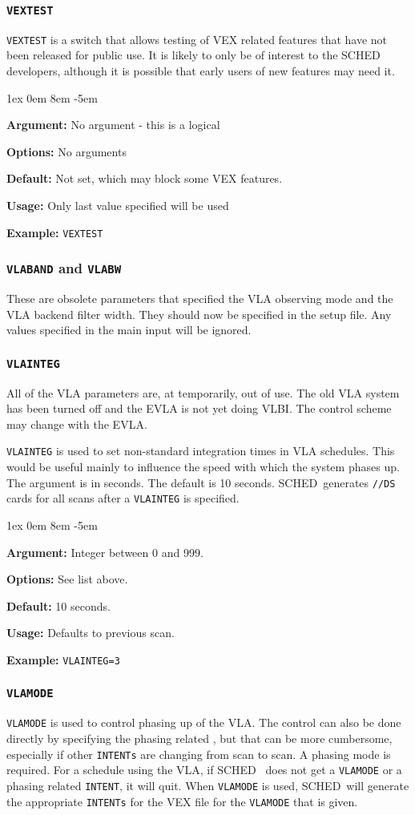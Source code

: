 \documentclass{report}
\newcommand{\schedb}{{\sc SCHED~}}
\newcommand{\rcwbox}[5]{
  \begin{list}{}{\parsep 1ex  \itemsep 0em
                 \leftmargin 8em  \itemindent -5em }
    \item {\bf Argument:} #1
    \item {\bf Options:}  #2
    \item {\bf Default:}  #3
    \item {\bf Usage:}    #4
    \item {\bf Example:}  #5
  \end{list}
}
\begin{document}
\subsubsection{\label{MP:VEXTEST}{\tt VEXTEST}}

{\tt VEXTEST} is a switch that allows testing of VEX related features
that have not been released for public use.  It is likely to only be
of interest to the SCHED developers, although it is possible that
early users of new features may need it.

\rcwbox
{No argument - this is a logical}
{No arguments}
{Not set, which may block some VEX features.}
{Only last value specified will be used}
{{\tt VEXTEST}}

\subsubsection{{\tt VLABAND} and {\tt VLABW}}

These are obsolete parameters that specified the VLA observing mode
and the VLA backend filter width.  They should now be specified in
the setup file.  Any values specified in the main input will be
ignored.


\subsubsection{\label{MP:VLAINTEG}{\tt VLAINTEG}}

All of the VLA parameters are, at temporarily, out of use.  The old
VLA system has been turned off and the EVLA is not yet doing VLBI.
The control scheme may change with the EVLA.

{\tt VLAINTEG} is used to set non-standard integration times in VLA
schedules.  This would be useful mainly to influence the speed with
which the system phases up.  The argument is in seconds.  The default
is 10 seconds.  \schedb generates {\tt //DS} cards for all scans
after a {\tt VLAINTEG} is specified.

\rcwbox
{Integer between 0 and 999.}
{See list above.}
{10 seconds.}
{Defaults to previous scan.}
{{\tt VLAINTEG=3}}


\subsubsection{\label{MP:VLAMODE}{\tt VLAMODE}}

{\tt VLAMODE} is used to control phasing up of the VLA.  The control
can also be done directly by specifying the phasing related
, but that can be more cumbersome,
especially if other {\tt INTENTs} are changing from scan to scan.  A
phasing mode is required.  For a schedule using the VLA, if \schedb
does not get a {\tt VLAMODE} or a phasing related {\tt INTENT}, it
will quit.  When {\tt VLAMODE} is used, \schedb will generate the
appropriate {\tt INTENTs} for the VEX file for the {\tt VLAMODE} that
is given.
\end{document}
